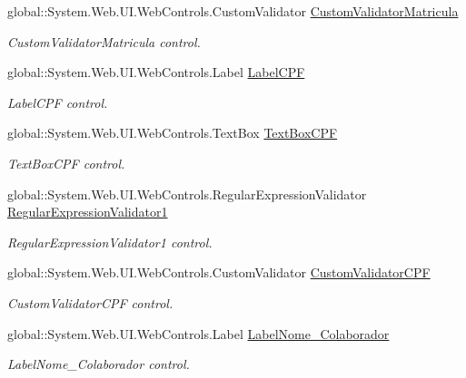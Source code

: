 \begin{DoxyCompactItemize}
global::System.Web.UI.WebControls.CustomValidator \hyperlink{class_sistema_r_h_1_1_cadastro_docs_a864fa2442799138c4e79ef11d7660289}{CustomValidatorMatricula}
\begin{DoxyCompactList}\small\item\em CustomValidatorMatricula control. \item\end{DoxyCompactList}\item 
global::System.Web.UI.WebControls.Label \hyperlink{class_sistema_r_h_1_1_cadastro_docs_a5526d44d5d274f837ab5f0847133844c}{LabelCPF}
\begin{DoxyCompactList}\small\item\em LabelCPF control. \item\end{DoxyCompactList}\item 
global::System.Web.UI.WebControls.TextBox \hyperlink{class_sistema_r_h_1_1_cadastro_docs_a74b78098bf3b6eb0cfafde04d71d0b35}{TextBoxCPF}
\begin{DoxyCompactList}\small\item\em TextBoxCPF control. \item\end{DoxyCompactList}\item 
global::System.Web.UI.WebControls.RegularExpressionValidator \hyperlink{class_sistema_r_h_1_1_cadastro_docs_a5e95292e8aec7a971acf5aeec2afef00}{RegularExpressionValidator1}
\begin{DoxyCompactList}\small\item\em RegularExpressionValidator1 control. \item\end{DoxyCompactList}\item 
global::System.Web.UI.WebControls.CustomValidator \hyperlink{class_sistema_r_h_1_1_cadastro_docs_a6eba4bc5c40034a547b489b7bd86e717}{CustomValidatorCPF}
\begin{DoxyCompactList}\small\item\em CustomValidatorCPF control. \item\end{DoxyCompactList}\item 
global::System.Web.UI.WebControls.Label \hyperlink{class_sistema_r_h_1_1_cadastro_docs_a05f83bf0a33b8127a9104de81cf2eebd}{LabelNome\_\-Colaborador}
\begin{DoxyCompactList}\small\item\em LabelNome\_\-Colaborador control. \item\end{DoxyCompactList}\item 

\end{DoxyCompactItemize}
